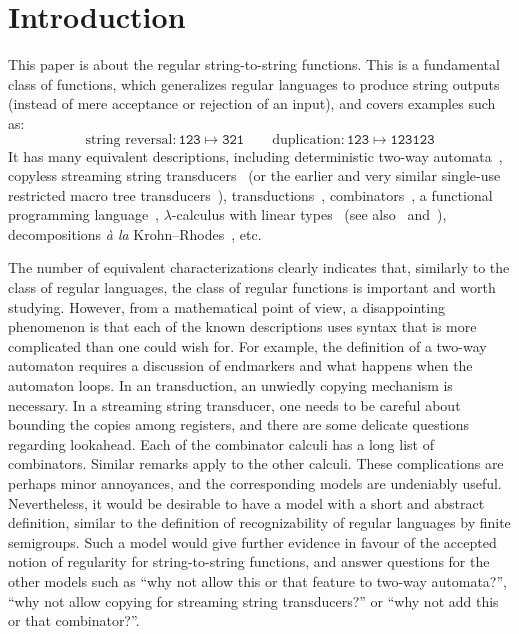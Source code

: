 \section{Introduction}
\label{sec:intro}

This paper is about the regular string-to-string functions. This is a
fundamental class of functions, which generalizes regular languages to produce string
outputs (instead of mere acceptance or rejection of an input), and covers
examples such as:
\[ \text{string reversal}\colon \mathtt{123 \mapsto 321} \qquad \text{duplication}\colon \mathtt{123 \mapsto 123123}\]
It has many equivalent descriptions, including deterministic two-way automata~\cite[Note~4]{shepherdson1959reduction}, copyless streaming string transducers~\cite[Section~3]{alurExpressivenessStreamingString2010} (or the earlier and very similar single-use restricted macro tree transducers~\cite[Section~5]{MacroMSO}), \mso transductions~\cite[Theorem~13]{engelfrietMSODefinableString2001}, combinators~\cite[Section~2]{alur2014regular}, a functional programming language~\cite[Section~6]{bojanczykRegularFirstOrderList2018}, $\lambda$-calculus with linear types~\cite[Theorem~3]{LambdaTransducer} (see also~\cite[Claim~6.2]{IATLC} and~\cite[Theorem~1.2.3]{titoPhD}), decompositions \textit{à la} Krohn--Rhodes~\cite[Theorem~18, item~4]{bojanczykstefanski2020}, etc.

The number of equivalent characterizations clearly indicates that, similarly to the class of regular languages, the class of regular functions is important and worth studying. However, from a mathematical point of view, a disappointing phenomenon is that each of the known descriptions uses syntax that is more complicated than one could wish for. For example, the definition of a two-way automaton requires a discussion of endmarkers and what happens when the automaton loops. In an \mso transduction, an unwiedly copying mechanism is necessary. In a streaming string transducer, one needs to be careful about bounding the copies among registers, and there are some delicate questions regarding lookahead. Each of the combinator calculi has a long list of combinators. Similar remarks apply to the other calculi. These complications are perhaps minor annoyances, and the corresponding models are undeniably useful. Nevertheless, it would be desirable to have a model with a short and abstract definition, similar to the definition of recognizability of regular languages by finite semigroups. Such a model  would give further evidence in favour of the accepted notion of regularity for string-to-string functions, and answer questions for the other models such as ``why not allow this or that feature to two-way automata?'', ``why not allow copying for streaming string transducers?'' or ``why not add this or that combinator?''.

